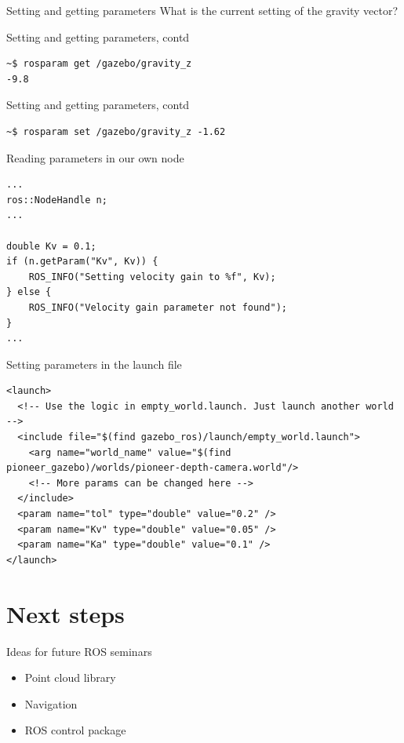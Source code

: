 \documentclass[presentation,aspectratio=1610]{beamer}
\begin{document}
\begin{frame}[label=sec-6-2]{Setting and getting parameters}
What is the current setting of the gravity vector?
\end{frame}

\begin{frame}[fragile,label=sec-6-3]{Setting and getting parameters, contd}
 \begin{verbatim}
~$ rosparam get /gazebo/gravity_z
-9.8
\end{verbatim}
\end{frame}

\begin{frame}[fragile,label=sec-6-4]{Setting and getting parameters, contd}
 \begin{verbatim}
~$ rosparam set /gazebo/gravity_z -1.62
\end{verbatim}
\end{frame}

\begin{frame}[fragile,label=sec-6-5]{Reading parameters in our own node}
 \begin{verbatim}
...
ros::NodeHandle n;
...

double Kv = 0.1; 
if (n.getParam("Kv", Kv)) {
    ROS_INFO("Setting velocity gain to %f", Kv);
} else {
    ROS_INFO("Velocity gain parameter not found");
}
...
\end{verbatim}
\end{frame}

\begin{frame}[fragile,label=sec-6-6]{Setting parameters in the launch file}
 \begin{verbatim}
<launch>
  <!-- Use the logic in empty_world.launch. Just launch another world -->
  <include file="$(find gazebo_ros)/launch/empty_world.launch">
    <arg name="world_name" value="$(find pioneer_gazebo)/worlds/pioneer-depth-camera.world"/>
    <!-- More params can be changed here -->
  </include>
  <param name="tol" type="double" value="0.2" />
  <param name="Kv" type="double" value="0.05" />
  <param name="Ka" type="double" value="0.1" />
</launch>
\end{verbatim}
\end{frame}

\section{Next steps}
\label{sec-7}
\begin{frame}[label=sec-7-1]{Ideas for future ROS seminars}
\begin{itemize}
\item Point cloud library
\item Navigation
\item ROS control package
\end{itemize}
\end{frame}
\end{document}
